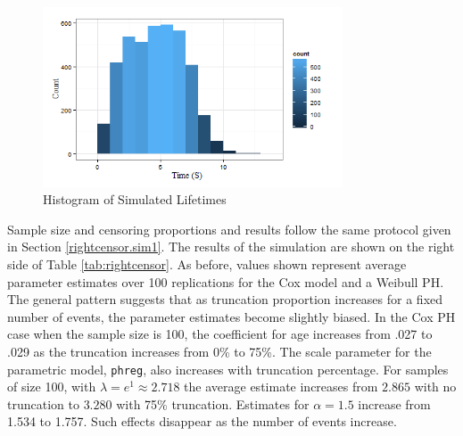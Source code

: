 \documentclass[12pt,letterpaper]{article}
\begin{document}
\begin{figure}[h!]
	\centering
    \includegraphics[width=3.5in]{truncationhist.png}
	\caption{Histogram of Simulated Lifetimes}
 	\label{fig:trunchist}
 \end{figure}

Sample size and censoring proportions and results follow the same protocol given in Section \ref{rightcensor.sim1}.  The results of the simulation are shown on the right side of Table \ref{tab:rightcensor}.  As before, values shown represent average parameter estimates over 100 replications for the Cox model and a Weibull PH.  The general pattern suggests that as truncation proportion increases for a fixed number of events, the parameter estimates become slightly biased.  In the Cox PH case when the sample size is 100, the coefficient for age increases from .027 to .029 as the truncation increases from 0\% to 75\%.  The scale parameter for the parametric model, {\tt phreg}, also increases with truncation percentage.  For samples of size 100, with $\lambda = e^1 \approx 2.718$ the average estimate increases from $2.865$ with no truncation to $3.280$ with 75\% truncation.  Estimates for $\alpha = 1.5$ increase from 1.534 to 1.757. Such effects disappear as the number of events increase.
\end{document}
